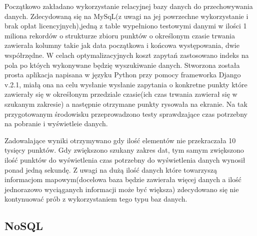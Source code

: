 Początkowo zakładano wykorzystanie relacyjnej bazy danych do przechowywania danych.
Zdecydowaną się na MySqL(z uwagi na jej powrzechne wykorzystanie i brak opłat licencyjnych),jedną z table wypełniono testowymi danymi w ilości 1 miliona rekordów o strukturze zbioru punktów o określonym czasie trwania zawierała kolumny takie jak data początkowa i końcowa występowania, dwie współrzędne. W celach optymalizacyjnych koszt zapytań zastosowano indeks na pola po któych wykonywane będzię wyszukiwanie danych.
Stworzona została prosta aplikacja napisana w języku Python przy pomocy frameworka Django v.2.1, miałą ona na celu wysłanie wysłanie zapytania o konkretne punkty które zawierały się w okreśłonym przedziale czasie(ich czas trwania zawierał się w szukanym zakresie) a następnie otrzymane punkty rysowała na ekranie. Na tak przygotowanym środowisku przeprowadzono testy sprawdzające czas potrzebny na pobranie i wyświetleie danych.

Zadowalające wyniki otrzymywano gdy ilość elementów nie przekraczała 10 tysięcy punktów. Gdy zwiększono szukany zakres dat, tym samym zwiększono ilość punktów do wyświetlenia czas potrzebny do wyświetlenia danych wynosił ponad jedną sekundę. Z uwagi na dużą ilość danych które towarzyszą informacjom mapowym(docelowa baza będzie zawierała więcej danych a ilość jednorazowo wyciąganych informacji może być większa) zdecydowano się nie kontynuować prób z wykorzystaniem tego typu baz danych.

\subsection{NoSQL}
\label{sec:nosql}

